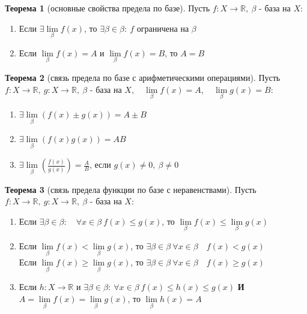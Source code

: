 \documentclass{report}
\theoremstyle{definition}
\newtheorem{theorem}{Теорема}[section]
\begin{document}
\begin{theorem}[основные свойства предела по базе]
  Пусть $f:X\rightarrow\mathbb{R}, \ \beta$ - база на $X$:
  \begin{enumerate}
    \item Если $\exists \underset{\beta}{\lim}f(x)$, то $\exists \beta \in \beta: \ f$ ограничена на $\beta$
    \item Если $\underset{\beta}{\lim}f(x) = A$ и $\underset{\beta}{\lim}f(x) = B$, то $A = B$
  \end{enumerate}
\end{theorem}

\clearpage

\begin{theorem}[связь предела по базе с арифметическими операциями]
  Пусть $f:X\rightarrow\mathbb{R}, \ g:X\rightarrow\mathbb{R}, \ \beta$ - база на $X, \quad \underset{\beta}
    {\lim}f(x) = A, \quad \underset{\beta}{\lim}g(x) = B$:
  \begin{enumerate}
    \item $\exists \underset{\beta}{\lim}(f(x)\pm g(x)) = A\pm B$
    \item $\exists \underset{\beta}{\lim}(f(x)g(x)) = AB$
    \item $\exists \underset{\beta}{\lim}(\frac{f(x)}{g(x)}) = \frac{A}{B}$, если $g(x)\ne 0, \ \beta \ne 0$
  \end{enumerate}
\end{theorem}

\begin{theorem}[связь предела функции по базе с неравенствами]
  Пусть $f:X\rightarrow\mathbb{R}, \ g:X\rightarrow\mathbb{R}, \ \beta$ - база на $X$:
  \begin{enumerate}
    \item Если $\exists\beta\in\beta: \quad \forall x \in \beta \ f(x) \leqslant g(x)$, то $\underset{\beta}
            {\lim}f(x) \leqslant \underset{\beta}{\lim}g(x)$
    \item Если $\underset{\beta}{\lim}f(x) < \underset{\beta}{\lim}g(x)$, то $\exists\beta\in\beta \ \forall
            x \in \beta \quad f(x) < g(x)$\\

          Если $\underset{\beta}{\lim}f(x) \geqslant \underset{\beta}{\lim}g(x)$, то $\exists\beta\in\beta \ \forall
            x \in \beta \quad f(x) \geqslant g(x)$
    \item Если $h:X\rightarrow \mathbb{R}$ и $\exists\beta\in\beta: \ \forall x \in \beta \ f(x) \leqslant h(x)
            \leqslant g(x)$ \textbf{И} $A = \underset{\beta}{\lim}f(x) = \underset{\beta}{\lim}g(x)$, то $\underset{\beta}
            {\lim}h(x) = A$
  \end{enumerate}
\end{theorem}
\end{document}
